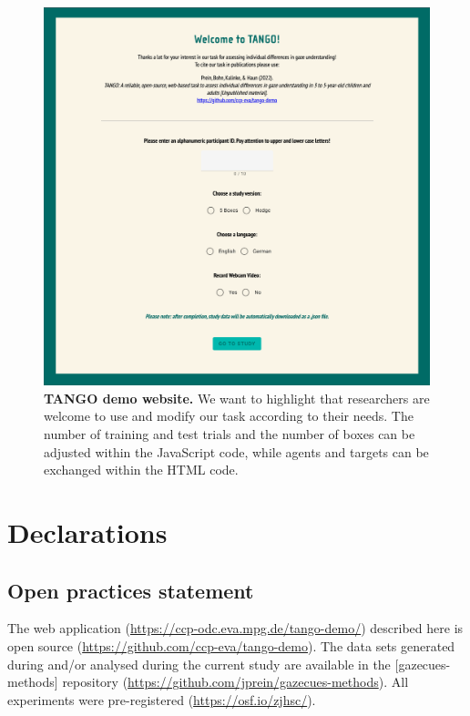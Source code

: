 \documentclass[
  man,floatsintext]{apa7}
\begin{document}
\begin{figure}

{\centering \includegraphics[width=1\linewidth]{../figures/tango_demo_screenshot} 

}

\caption{\textbf{TANGO demo website.} We want to highlight that researchers are welcome to use and modify our task according to their needs. The number of training and test trials and the number of boxes can be adjusted within the JavaScript code, while agents and targets can be exchanged within the HTML code.}\label{fig:fig5}
\end{figure}

\newpage

\hypertarget{declarations}{%
\section{Declarations}\label{declarations}}

\hypertarget{open-practices-statement}{%
\subsection{Open practices statement}\label{open-practices-statement}}

The web application (\url{https://ccp-odc.eva.mpg.de/tango-demo/}) described here is open source (\url{https://github.com/ccp-eva/tango-demo}).
The data sets generated during and/or analysed during the current study are available in the {[}gazecues-methods{]} repository (\url{https://github.com/jprein/gazecues-methods}).
All experiments were pre-registered (\url{https://osf.io/zjhsc/}).
\end{document}
